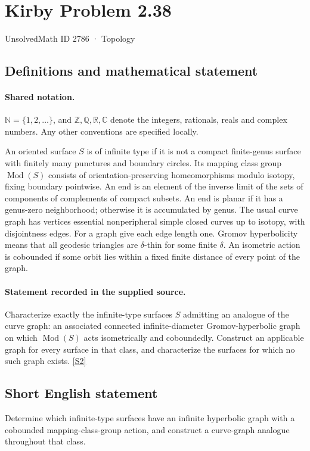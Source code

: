 \documentclass[11pt]{article}
\newcommand{\sref}[2]{\hyperlink{source:#1:#2}{[S#2]}}
\begin{document}
\setcounter{section}{2785}
\section{Kirby Problem 2.38}\label{2786}
{\small\sffamily UnsolvedMath ID 2786 · Topology}
\subsection{Definitions and mathematical statement}

\paragraph{Shared notation.}$\mathbb N=\{1,2,\ldots\}$, and $\mathbb Z,\mathbb Q,\mathbb R,\mathbb C$ denote the integers, rationals, reals and complex numbers. Any other conventions are specified locally.


An oriented surface $S$ is of infinite type if it is not a compact finite-genus surface with finitely many punctures and boundary circles. Its mapping class group $\operatorname{Mod}(S)$ consists of orientation-preserving homeomorphisms modulo isotopy, fixing boundary pointwise. An end is an element of the inverse limit of the sets of components of complements of compact subsets. An end is planar if it has a genus-zero neighborhood; otherwise it is accumulated by genus. The usual curve graph has vertices essential nonperipheral simple closed curves up to isotopy, with disjointness edges. For a graph give each edge length one. Gromov hyperbolicity means that all geodesic triangles are $\delta$-thin for some finite $\delta$. An isometric action is cobounded if some orbit lies within a fixed finite distance of every point of the graph.
\paragraph{Statement recorded in the supplied source.}
Characterize exactly the infinite-type surfaces $S$ admitting an analogue of the curve graph: an associated connected infinite-diameter Gromov-hyperbolic graph on which $\operatorname{Mod}(S)$ acts isometrically and coboundedly. Construct an applicable graph for every surface in that class, and characterize the surfaces for which no such graph exists. \sref{2786}{2}

\subsection{Short English statement}
Determine which infinite-type surfaces have an infinite hyperbolic graph with a cobounded mapping-class-group action, and construct a curve-graph analogue throughout that class.
\end{document}
